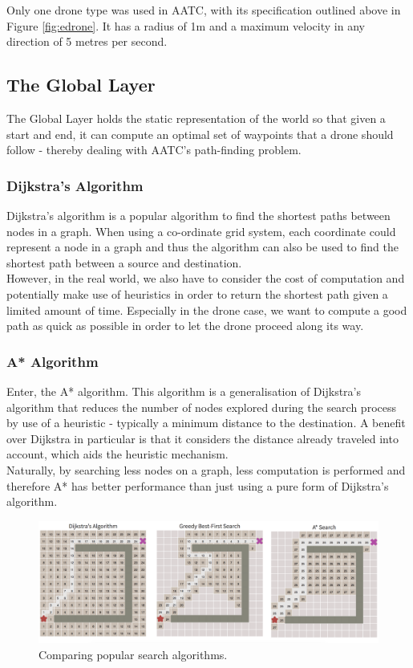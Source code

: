 \documentclass[a4paper,12pt,titlepage]{article}
\begin{document}
Only one drone type was used in AATC, with its specification outlined above in Figure \ref{fig:edrone}. It has a radius of 1m and a maximum velocity in any direction of 5 metres per second.

\subsection{The Global Layer}
The Global Layer holds the static representation of the world so that given a start and end, it can compute an optimal set of waypoints that a drone should follow - thereby dealing with AATC's path-finding problem.

\subsubsection{Dijkstra's Algorithm}
Dijkstra's algorithm is a popular algorithm to find the shortest paths between nodes in a graph. When using a co-ordinate grid system, each coordinate could represent a node in a graph and thus the algorithm can also be used to find the shortest path between a source and destination. \\

However, in the real world, we also have to consider the cost of computation and potentially make use of heuristics in order to return the shortest path given a limited amount of time. Especially in the drone case, we want to compute a good path as quick as possible in order to let the drone proceed along its way.

\subsubsection{A* Algorithm}
Enter, the A* algorithm. This algorithm is a generalisation of Dijkstra's algorithm that reduces the number of nodes explored during the search process by use of a heuristic - typically a minimum distance to the destination. A benefit over Dijkstra in particular is that it considers the distance already traveled into account, which aids the heuristic mechanism. \\

Naturally, by searching less nodes on a graph, less computation is performed and therefore A* has better performance than just using a pure form of Dijkstra's algorithm.

\begin{figure}[!hbpt]
  \center
  \includegraphics[width=\linewidth]{img/search_comparison.png}
  \caption{Comparing popular search algorithms. \cite{Balaji2017}}
  \label{fig:search_comparison}
\end{figure}
\end{document}
